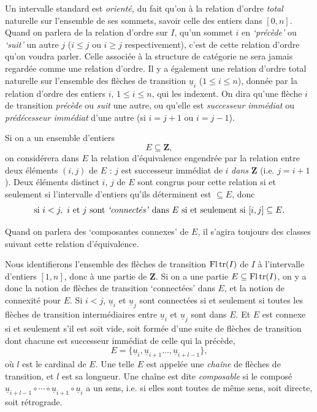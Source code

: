 Un intervalle standard est \textit{orienté,} du fait qu'on à la relation d'ordre \textit{total} naturelle sur l'ensemble de ses sommets, savoir celle des entiers dans $[0,n]$. Quand on parlera de la relation d'ordre sur $I$, qu'un sommet $i$ en \textit{‘précède’} ou \textit{‘suit’} un autre $j$ ($i\leq j$ ou $i\geq j$ respectivement), c'est de cette relation d'ordre qu'on voudra parler. Celle associée à la structure de catégorie ne sera jamais regardée comme une relation d'ordre. Il y a également une relation d'ordre total naturelle sur l'ensemble des flèches de transition $\underline{u}_i$ ($1\leq i\leq n$), donnée par la relation d'ordre des entiers $i$, $1\leq i\leq n$, qui les indexent. On dira qu'une flèche $i$ de transition \textit{précède} ou \textit{suit} une autre, ou qu'elle est \textit{successeur immédiat} ou \textit{prédécesseur immédiat} d'une autre (si $i=j+1$ ou $i=j-1$). %


Si on a un ensemble d'entiers
\[
E\subseteq\mathbf{Z},
\]
on considérera dans $E$ la relation d'équivalence engendrée par la relation entre deux éléments $(i,j)$ de $E$ : $j$ est successeur immédiat de $i$ \textit{dans} $\mathbf{Z}$ (i.e. $j=i+1$). Deux éléments distinct $i$, $j$ de $E$ sont congrus pour cette relation si et seulement si l'intervalle d'entiers qu'ils déterminent est $\subseteq E$, donc %
\[
\text{si } i<j,\ i \text{ et } j \text{ sont \textit{‘connectés’} dans } E \text{ si et seulement si } [i,j]\subseteq E.
\]

Quand on parlera des ‘composantes connexes’ de $E$, il s'agira toujours des classes suivant cette relation d'équivalence.

Nous identifierons l'ensemble des flèches de transition $\operatorname{Fl}\operatorname{tr}(I)$ de $I$ à l'intervalle d'entiers $[1,n]$, donc à une partie de $\mathbf{Z}$. Si on a une partie $E\subseteq\operatorname{Fl}\operatorname{tr}(I)$, on y a donc la notion de flèches de transition ‘connectées’ dans $E$, et la notion de connexité pour $E$. Si $i<j$, $\underline{u}_i$ et $\underline{u}_j$ sont connectées si et seulement si toutes les flèches de transition intermédiaires entre $\underline{u}_i$ et $\underline{u}_j$ sont dans $E$. Et $E$ est connexe si et seulement s'il est soit vide, soit formée d'une suite de flèches de transition dont chacune est successeur immédiat de celle qui la précède, %
\[
E=\{\underline{u}_i,\underline{u}_{i+1}\ldots,\underline{u}_{i+l-1}\}, %
\]
où $l$ est le cardinal de $E$. Une telle $E$ est appelée une \textit{chaîne} de flèches de transition, et $l$ est sa longueur. Une chaîne est dite \textit{composable} si le composé $\underline{u}_{i+l-1}\circ\cdots\circ\underline{u}_{i+1}\circ\underline{u}_i$ a un sens, i.e. si elles sont toutes de même sens, soit directe, soit rétrograde.

